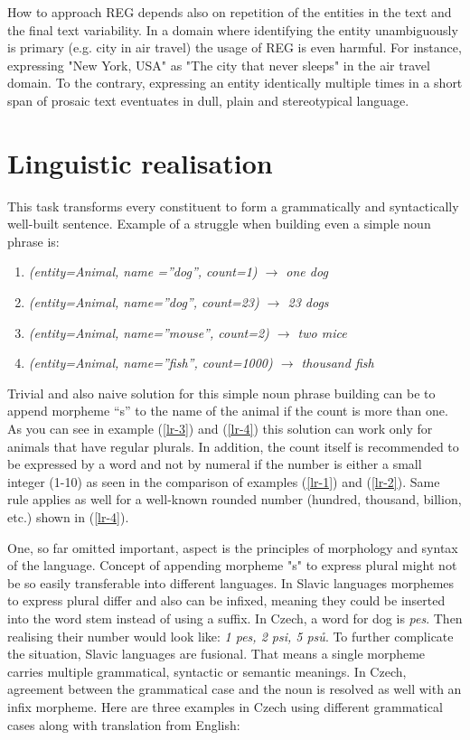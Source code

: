How to approach REG depends also on repetition of the entities in the text and the final text variability. In a domain where identifying the entity unambiguously is primary (e.g. city in air travel) the usage of REG is even harmful. For instance, expressing "New York, USA" as "The city that never sleeps" in the air travel domain. To the contrary, expressing an entity identically multiple times in a short span of prosaic text eventuates in dull, plain and stereotypical language. 

\section{Linguistic realisation}
This task transforms every constituent to form a grammatically and syntactically well-built sentence. Example of a struggle when building even a simple noun phrase is:
\begin{enumerate}
	\item \emph{(entity=Animal, name =”dog”, count=1) $\rightarrow$ one dog} \label{lr-1}
	\item \emph{(entity=Animal, name=”dog”, count=23) $\rightarrow$ 23 dogs} \label{lr-2}
	\item \emph{(entity=Animal, name=”mouse”, count=2) $\rightarrow$ two mice} \label{lr-3}
	\item \emph{(entity=Animal, name=”fish”, count=1000) $\rightarrow$ thousand fish} \label{lr-4}
\end{enumerate}

Trivial and also naive solution for this simple noun phrase building can be to append morpheme “s” to the name of the animal if the count is more than one. As you can see in example (\ref{lr-3}) and (\ref{lr-4}) this solution can work only for animals that have regular plurals. In addition, the count itself is recommended to be expressed by a word and not by numeral if the number is either a small integer (1-10) as seen in the comparison of  examples (\ref{lr-1}) and (\ref{lr-2}). Same rule applies as well for a well-known rounded number (hundred, thousand, billion, etc.) shown in (\ref{lr-4}).

One, so far omitted important, aspect is the principles of morphology and syntax of the language. Concept of appending morpheme "s" to express plural might not be so easily transferable into different languages. In Slavic languages morphemes to express plural differ and also can be infixed, meaning they could be inserted into the word stem instead of using a suffix. In Czech, a word for dog is \emph{pes}. Then realising their number would look like: \emph{1 pes, 2 psi, 5 psů}. To further complicate the situation, Slavic languages are fusional. That means a single morpheme carries multiple grammatical, syntactic or semantic meanings. In Czech, agreement between the grammatical case and the noun is resolved as well with an infix morpheme. Here are three examples in Czech using different grammatical cases along with translation from English:

